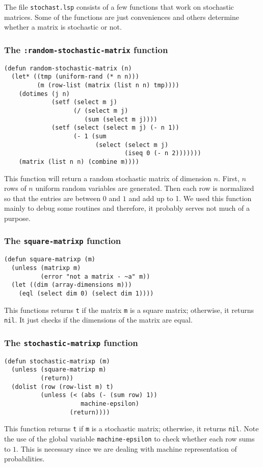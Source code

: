 The file {\tt stochast.lsp} consists of a few functions that work on
stochastic matrices.  Some of the functions are just conveniences and
others determine whether a matrix is stochastic or not. 

\subsubsection{The {\tt :random-stochastic-matrix} function}
\label{subsubsec:random-stochastic-matrix}
\begin{verbatim}
(defun random-stochastic-matrix (n)
  (let* ((tmp (uniform-rand (* n n)))
         (m (row-list (matrix (list n n) tmp))))
    (dotimes (j n)
             (setf (select m j)
                   (/ (select m j) 
                      (sum (select m j))))
             (setf (select (select m j) (- n 1)) 
                   (- 1 (sum 
                         (select (select m j)
                                 (iseq 0 (- n 2)))))))
    (matrix (list n n) (combine m))))
\end{verbatim}
This function will return a random stochastic matrix of dimension $n$. 
First, $n$ rows of $n$ uniform random variables are generated. Then
each row is normalized so that the entries are between $0$ and $1$ and
add up to 1.  We used this function mainly to debug some routines and
therefore, it probably serves not much of a purpose.

\subsubsection{The {\tt square-matrixp} function}
\label{subsubsec:square-matrixp}
\begin{verbatim}
(defun square-matrixp (m)
  (unless (matrixp m) 
          (error "not a matrix - ~a" m))
  (let ((dim (array-dimensions m)))
    (eql (select dim 0) (select dim 1))))
\end{verbatim}
This functions returns {\tt t} if the matrix {\tt m} is a square
matrix; otherwise, it returns {\tt nil}.  It just checks if the
dimensions of the matrix are equal.

\subsubsection{The {\tt stochastic-matrixp} function}
\label{subsubsec:stochastic-matrixp}
\begin{verbatim}
(defun stochastic-matrixp (m)
  (unless (square-matrixp m)
          (return))
  (dolist (row (row-list m) t)
          (unless (< (abs (- (sum row) 1)) 
                     machine-epsilon)
                  (return))))
\end{verbatim}
This function returns {\tt t} if {\tt m} is a stochastic matrix;
otherwise, it returns {\tt nil}.  Note the use of the global variable
{\tt machine-epsilon} to check whether each row sums to $1$. This is
necessary since we are dealing with machine representation of
probabilities. 


